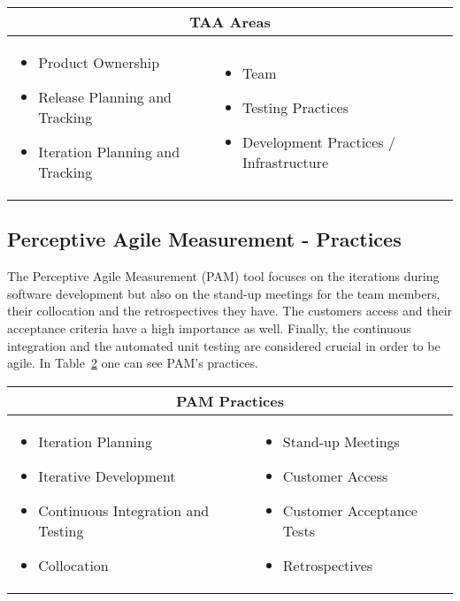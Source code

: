 \begin{table}
  \begin{tabular}{| p{5cm} p{5cm} |}
    \hline
    \multicolumn{2}{|c|}{\textbf{\ac{TAA} Areas}}  \\ \hline
     \begin{itemize} \item Product Ownership \item Release Planning and Tracking \item Iteration Planning and Tracking \end{itemize} &
     \begin{itemize}  \item Team \item Testing Practices \item Development Practices / Infrastructure \end{itemize}  \\ \hline
  \end{tabular}
  \label{table:taa_practices}
\end{table}

\subsection[\ac{PAM} Practices]{Perceptive Agile Measurement - Practices}
The Perceptive Agile Measurement (\ac{PAM}) tool focuses on the iterations during software development but also on the stand-up meetings for the team members, their collocation and the retrospectives they have. The customers access and their acceptance criteria have a high importance as well. Finally, the continuous integration and the automated unit testing are considered crucial in order to be agile. In Table~\ref{table:pam_practices} one can see \ac{PAM}'s practices.

\begin{table} [H]
  \begin{tabular}{| p{6cm} p{6cm} |}
    \hline
    \multicolumn{2}{|c|}{\textbf{\ac{PAM} Practices}}  \\ \hline
    	\begin{itemize} \item Iteration Planning \item Iterative Development \item Continuous Integration and Testing \item Collocation \end{itemize} &
     \begin{itemize} \item Stand-up Meetings \item Customer Access \item Customer Acceptance Tests \item Retrospectives \end{itemize}  \\ \hline
  \end{tabular}
  \label{table:pam_practices}
\end{table}

